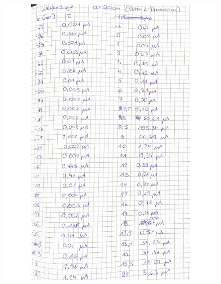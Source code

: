 \begin{figure}[H]
  \centering
  \includegraphics[width=\textwidth]{"Messwerte/V61Messdaten_06.pdf"}
  \label{fig:Messungen_6}
\end{figure}

